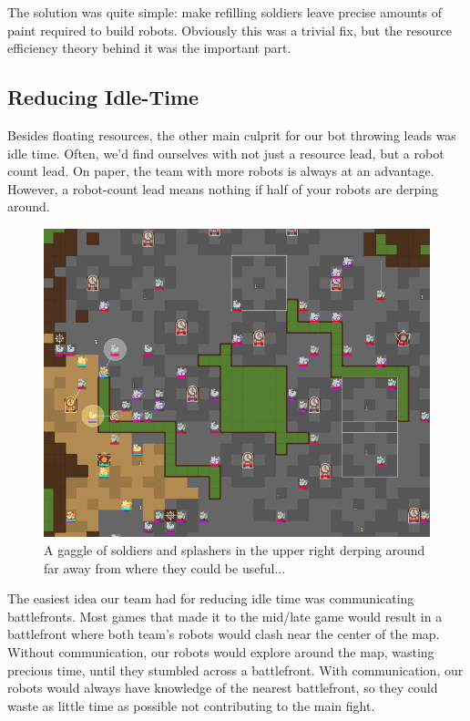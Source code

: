 \medskip

The solution was quite simple: make refilling soldiers leave precise amounts of paint required to build robots. Obviously this was a trivial fix, but the resource efficiency theory behind it was the important part.

\subsection{Reducing Idle-Time}

Besides floating resources, the other main culprit for our bot throwing leads was idle time. Often, we'd find ourselves with not just a resource lead, but a robot count lead. On paper, the team with more robots is always at an advantage. However, a robot-count lead means nothing if half of your robots are derping around.

\begin{figure}[h]
    \centering
    \includegraphics[scale=0.5]{images/idle_time.png}
    \caption{A gaggle of soldiers and splashers in the upper right derping around far away from where they could be useful...}
\end{figure}

\medskip

The easiest idea our team had for reducing idle time was communicating battlefronts. Most games that made it to the mid/late game would result in a battlefront where both team's robots would clash near the center of the map. Without communication, our robots would explore around the map, wasting precious time, until they stumbled across a battlefront. With communication, our robots would always have knowledge of the nearest battlefront, so they could waste as little time as possible not contributing to the main fight.

